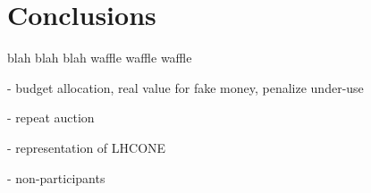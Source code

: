 \section{Conclusions}

blah blah blah
waffle waffle waffle


- budget allocation, real value for fake money, penalize under-use

- repeat auction

- representation of LHCONE

- non-participants